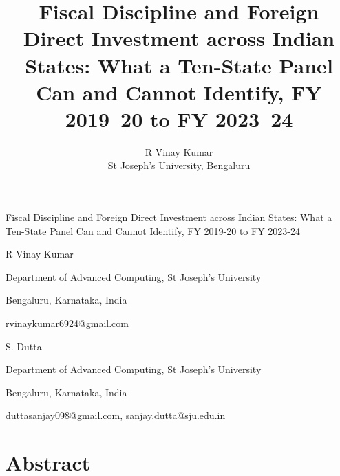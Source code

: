 \documentclass[12pt,a4paper]{article}
\title{\bfseries Fiscal Discipline and Foreign Direct Investment across Indian States: What a Ten-State Panel Can and Cannot Identify, FY 2019--20 to FY 2023--24}
\author{R Vinay Kumar\\[2pt]\normalsize St Joseph's University, Bengaluru}
\date{}
\begin{document}
\maketitle
Fiscal Discipline and Foreign Direct Investment across Indian States: What a Ten-State Panel Can and Cannot Identify, FY 2019-20 to FY 2023-24

R Vinay Kumar

Department of Advanced Computing, St Joseph's University

Bengaluru, Karnataka, India

rvinaykumar6924@gmail.com

S. Dutta

Department of Advanced Computing, St Joseph's University

Bengaluru, Karnataka, India

duttasanjay098@gmail.com, sanjay.dutta@sju.edu.in

\section*{Abstract}
\end{document}
